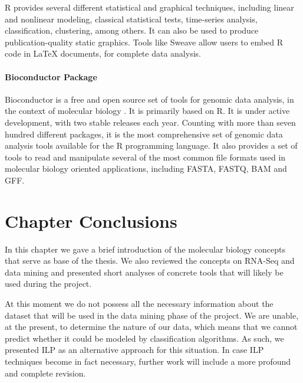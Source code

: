 R provides several different statistical and graphical techniques, including
linear and nonlinear modeling, classical statistical tests, time-series
analysis, classification, clustering, among others. It can also be used to
produce publication-quality static graphics. Tools like Sweave
\cite{lmucs-papers:Leisch:2002} allow users to embed R code in \LaTeX{}
documents, for complete data analysis.

\paragraph{Bioconductor Package}

Bioconductor is a free and open source set of tools for genomic data analysis,
in the context of molecular biology \cite{lmucs-papers:Leisch:2002}. It is
primarily based on R. It is under active development, with two stable releases
each year. Counting with more than seven hundred different packages, it is the
most comprehensive set of genomic data analysis tools available for the R
programming language. It also provides a set of tools to read and manipulate
several of the most common file formats used in molecular biology oriented
applications, including FASTA, FASTQ, BAM and GFF.

\section{Chapter Conclusions}

In this chapter we gave a brief introduction of the molecular biology concepts
that serve as base of the thesis. We also reviewed the concepts on RNA-Seq and
data mining and presented short analyses of concrete tools that will likely be
used during the project.

At this moment we do not possess all the necessary information about the dataset
that will be used in the data mining phase of the project. We are unable, at the
present, to determine the nature of our data, which means that we cannot predict
whether it could be modeled by classification algorithms. As such, we presented
ILP as an alternative approach for this situation. In case ILP techniques become
in fact necessary, further work will include a more profound and complete
revision.
